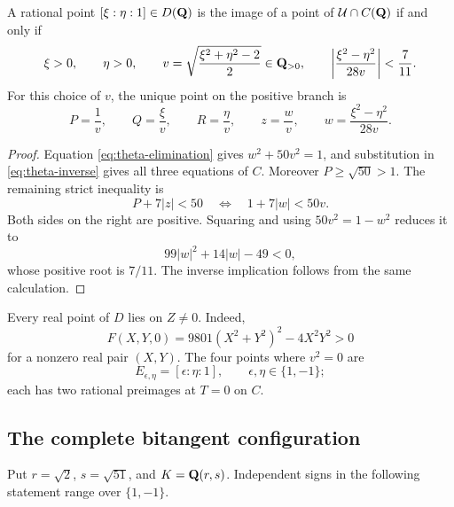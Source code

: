 \begin{proposition}
\label{prop:theta-strict-lift}
A rational point $[\xi:\eta:1]\in D(\mathbf Q)$ is the image of a point of
$\mathcal U\cap C(\mathbf Q)$ if and only if
\begin{equation}
 \xi>0,\qquad\eta>0,\qquad
 v=\sqrt{\frac{\xi^2+\eta^2-2}{2}}\in\mathbf Q_{>0},\qquad
 \left|\frac{\xi^2-\eta^2}{28v}\right|<\frac7{11}.
 \label{eq:theta-strict-lift}
\end{equation}
For this choice of $v$, the unique point on the positive branch is
\begin{equation}
 P=\frac1v,\qquad Q=\frac\xi v,\qquad R=\frac\eta v,
 \qquad z=\frac wv,
 \qquad w=\frac{\xi^2-\eta^2}{28v}.
 \label{eq:theta-inverse}
\end{equation}
\end{proposition}

\begin{proof}
Equation \eqref{eq:theta-elimination} gives $w^2+50v^2=1$, and substitution
in \eqref{eq:theta-inverse} gives all three equations of $C$.
Moreover $P\ge\sqrt{50}>1$.  The remaining strict inequality is
\[
 P+7|z|<50\quad\Longleftrightarrow\quad1+7|w|<50v.
\]
Both sides on the right are positive.  Squaring and using
$50v^2=1-w^2$ reduces it to
\[
 99|w|^2+14|w|-49<0,
\]
whose positive root is $7/11$.  The inverse implication follows from the
same calculation.
\end{proof}

Every real point of $D$ lies on $Z\ne0$.  Indeed,
\[
 F(X,Y,0)=9801(X^2+Y^2)^2-4X^2Y^2>0
\]
for a nonzero real pair $(X,Y)$.  The four points where $v^2=0$ are
\begin{equation}
 E_{\epsilon,\eta}=[\epsilon:\eta:1],\qquad
 \epsilon,\eta\in\{1,-1\};
 \label{eq:theta-four-boundary}
\end{equation}
each has two rational preimages at $T=0$ on $C$.

\subsection{The complete bitangent configuration}

Put $r=\sqrt2$, $s=\sqrt{51}$, and $K=\mathbf Q(r,s)$.  Independent signs in the
following statement range over $\{1,-1\}$.

